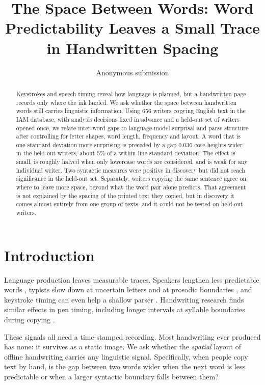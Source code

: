 \documentclass[11pt]{article}
\title{The Space Between Words: Word Predictability Leaves a Small Trace in Handwritten Spacing}
\author{Anonymous submission}
\date{}
\begin{document}
\maketitle

\begin{abstract}
Keystrokes and speech timing reveal how language is planned, but a handwritten page records only where the ink landed. We ask whether the space between handwritten words still carries linguistic information. Using 656 writers copying English text in the IAM database, with analysis decisions fixed in advance and a held-out set of writers opened once, we relate inter-word gaps to language-model surprisal and parse structure after controlling for letter shapes, word length, frequency and layout. A word that is one standard deviation more surprising is preceded by a gap \(0.036\) core heights wider in the held-out writers, about 5\% of a within-line standard deviation. The effect is small, is roughly halved when only lowercase words are considered, and is weak for any individual writer. Two syntactic measures were positive in discovery but did not reach significance in the held-out set. Separately, writers copying the same sentence agree on where to leave more space, beyond what the word pair alone predicts. That agreement is not explained by the spacing of the printed text they copied, but in discovery it comes almost entirely from one group of texts, and it could not be tested on held-out writers.
\end{abstract}

\section{Introduction}
Language production leaves measurable traces. Speakers lengthen less predictable words \citep{demberg2012}, typists slow down at uncertain letters \citep{crump2019} and at prosodic boundaries \citep{fuchs2016}, and keystroke timing can even help a shallow parser \citep{plank2016}. Handwriting research finds similar effects in pen timing, including longer intervals at syllable boundaries during copying \citep{kandel2006}.

These signals all need a time-stamped recording. Most handwriting ever produced has none: it survives as a static image. We ask whether the \emph{spatial} layout of offline handwriting carries any linguistic signal. Specifically, when people copy text by hand, is the gap between two words wider when the next word is less predictable or when a larger syntactic boundary falls between them?
\end{document}
